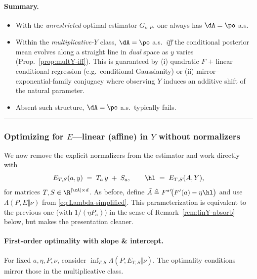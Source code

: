 \paragraph{Summary.}
\begin{itemize}
    \item With the \emph{unrestricted} optimal estimator $G_{\nu,P}$, one always has $\dA=\po$ a.s.
    \item Within the \emph{multiplicative-$Y$} class, $\dA=\po$ a.s.\ \emph{iff} the conditional posterior mean evolves along a straight line in \emph{dual} space as $y$ varies (Prop.~\ref{prop:multY-iff}). This is guaranteed by (i) quadratic $F$ $+$ linear conditional regression (e.g.\ conditional Gaussianity) or (ii) mirror–exponential-family conjugacy where observing $Y$ induces an additive shift of the natural parameter.
    \item Absent such structure, $\dA=\po$ a.s.\ typically fails.
\end{itemize}


\hrule

\subsubsection{Optimizing for \texorpdfstring{$E$}{E}---linear (affine) in \texorpdfstring{$Y$}{Y} without normalizers}
We now remove the explicit normalizers from the estimator and work directly with
\begin{equation}
    \label{eq:def-linY-no-norm}
    E_{T,S}(a,y)
    \;=\;
    T_a\,y \;+\; S_a,
    \qquad
    \hl \;=\; E_{T,S}(A,Y),
\end{equation}
for matrices $T,S \in \R^{|\cA|\times d}$.  As before, define
$\tilde{A}\triangleq {F^\star}'\!\big(F'(a)-\eta \hl\big)$ and use
$\Lambda(P,E\Vert \nu)$ from \eqref{eq:Lambda-simplified}.  This parameterization
is equivalent to the previous one (with $1/(\eta P_a)$) in the sense of
Remark~\ref{rem:linY-absorb} below, but makes the presentation cleaner.

\paragraph{First-order optimality with slope \& intercept.}
For fixed $a,\eta,P,\nu$, consider
\(
\inf_{T,S} \Lambda(P, E_{T,S}\Vert \nu)
\).
The optimality conditions mirror those in the multiplicative class.

